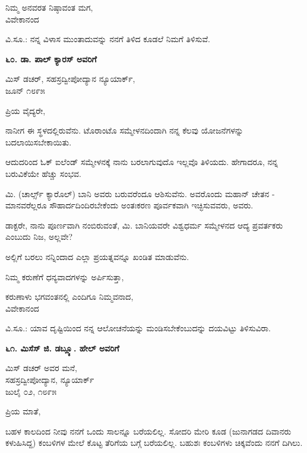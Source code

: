 \begin{flushright}
ನಿಮ್ಮ ಅನವರತ ನಿಷ್ಠಾವಂತ ಮಗ,\\ವಿವೇಕಾನಂದ
\end{flushright}

ವಿ.ಸೂ.: ನನ್ನ ವಿಳಾಸ ಮುಂತಾದುವನ್ನು ನನಗೆ ತಿಳಿದ ಕೂಡಲೆ ನಿಮಗೆ ತಿಳಿಸುವೆ.

\begin{center}
\textbf{೬೦. ಡಾ. ಪಾಲ್ ಕ್ಯಾರಸ್ ಅವರಿಗೆ}
\end{center}

\begin{flushright}
 ಮಿಸ್ ಡಚರ್, ಸಹಸ್ರದ್ವೀಪೋದ್ಯಾನ ನ್ಯೂಯಾರ್ಕ್,\\ಜೂನ್ ೧೮೯೫
\end{flushright}

ಪ್ರಿಯ ವೈದ್ಯರೇ,

ನಾನೀಗ ಈ ಸ್ಥಳದಲ್ಲಿರುವೆನು. ಟೊರಾಂಟೊ ಸಮ್ಮೇಳನದಿಂದಾಗಿ ನನ್ನ ಕೆಲವು ಯೋಜನೆಗಳನ್ನು ಬದಲಾಯಿಸಬೇಕಾಯಿತು.

ಆದುದರಿಂದ ಓಕ್ ಐಲೆಂಡ್ ಸಮ್ಮೇಳನಕ್ಕೆ ನಾನು ಬರಲಾಗುವುದೊ ಇಲ್ಲವೊ ತಿಳಿಯದು. ಹೇಗಾದರೂ, ನನ್ನ ಬರುವಿಕೆಯೇ ಹೆಚ್ಚು ಸಂಭವ.

ಮಿ. (ಚಾರ್ಲ್ಸ್ ಕ್ಯಾರೊಲ್) ಬಾನಿ ಅವರು ಬರುವರೆಂದೂ ಆಶಿಸುವೆನು. ಅವರೊಂದು ಮಹಾನ್ ಚೇತನ - ಮಾನವರೆಲ್ಲರೂ ಸೌಹಾರ್ದದಿಂದಿರಬೇಕೆಂದು ಅಂತಃಕರಣ ಪೂರ್ವಕವಾಗಿ ಇಚ್ಛಿಸುವವರು, ಅವರು.

ಡಾಕ್ಟರೇ, ನಾನು ಪೂರ್ಣವಾಗಿ ನಂಬಿರುವಂತೆ, ಮಿ. ಬಾನಿಯವರೇ ವಿಶ್ವಧರ್ಮ ಸಮ್ಮೇಳನದ ಆದ್ಯ ಪ್ರವರ್ತಕರು ಎಂಬುದು ನಿಜ, ಅಲ್ಲವೇ?

ಅಲ್ಲಿಗೆ ಬರಲು ನನ್ನಿಂದಾದ ಎಲ್ಲಾ ಪ್ರಯತ್ನವನ್ನೂ ಖಂಡಿತ ಮಾಡುವೆನು.

ನಿಮ್ಮ ಕರುಣೆಗೆ ಧನ್ಯವಾದಗಳನ್ನು ಅರ್ಪಿಸುತ್ತಾ,

\begin{flushright}
ಕರುಣಾಳು ಭಗವಂತನಲ್ಲಿ ಎಂದಿಗೂ ನಿಮ್ಮವನಾದ,\\ವಿವೇಕಾನಂದ
\end{flushright}

ವಿ.ಸೂ.: ಯಾವ ದೃಷ್ಟಿಯಿಂದ ನನ್ನ ಆಲೋಚನೆಯನ್ನು ಮಂಡಿಸಬೇಕೆಂಬುದನ್ನು ದಯವಿಟ್ಟು ತಿಳಿಸುವಿರಾ.

\begin{center}
\textbf{೬೧. ಮಿಸೆಸ್ ಜಿ. ಡಬ್ಲ್ಯೂ. ಹೇಲ್ ಅವರಿಗೆ}
\end{center}

\begin{flushright}
 ಮಿಸ್ ಡಚರ್ ಅವರ ಮನೆ,\\ಸಹಸ್ರದ್ವೀಪೋದ್ಯಾನ, ನ್ಯೂಯಾರ್ಕ್\\ಜುಲೈ ೦೨, ೧೮೯೫
\end{flushright}

ಪ್ರಿಯ ಮಾತೆ,

ಬಹಳ ಕಾಲದಿಂದ ನೀವು ನನಗೆ ಒಂದು ಸಾಲನ್ನೂ ಬರೆಯಲಿಲ್ಲ. ಸೋದರಿ ಮೇರಿ ಕೂಡ (ಜುನಾಗಡದ ದಿವಾನರು ಕಳುಹಿಸಿದ್ದ) ಕಂಬಳಿಗಳ ಮೇಲೆ ಕೊಟ್ಟ ತೆರಿಗೆಯ ಬಗ್ಗೆ ಬರೆಯಲಿಲ್ಲ. ಬಹುಶಃ ಕಂಬಳಿಗಳು ಚಿಕ್ಕವೆಂದು ನನಗೆ ದಿಗಿಲು.

